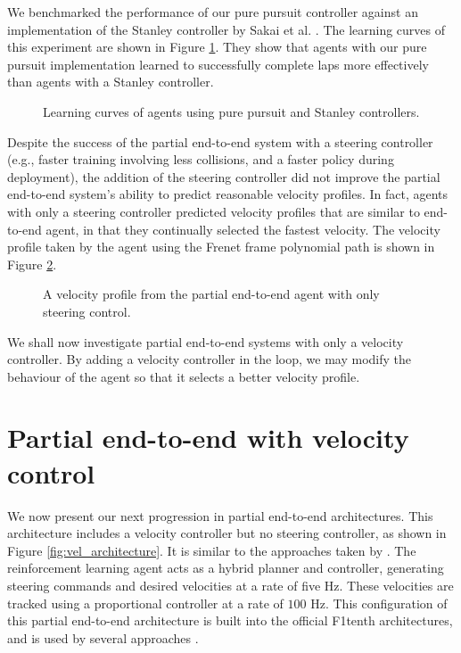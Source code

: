 We benchmarked the performance of our pure pursuit controller against an implementation of the Stanley controller by Sakai et al. \cite{Sakai2018}. 
The learning curves of this experiment are shown in Figure \ref{fig:path_tracker_comparison}.
They show that agents with our pure pursuit implementation learned to successfully complete laps more effectively than agents with a Stanley controller.

\begin{figure}[htb!]
    \centering
    
    \caption[Learning curves of agents using pure pursuit and Stanley controllers]{Learning curves of agents using pure pursuit and Stanley controllers.}
    \label{fig:path_tracker_comparison}
\end{figure}


Despite the success of the partial end-to-end system with a steering controller (e.g., faster training involving less collisions, and a faster policy during deployment), the addition of the steering controller did not improve the partial end-to-end system's ability to predict reasonable velocity profiles.
In fact, agents with only a steering controller predicted velocity profiles that are similar to end-to-end agent, in that they continually selected the fastest velocity. 
The velocity profile taken by the agent using the Frenet frame polynomial path is shown in Figure \ref{fig:velocity_profile_steer_agent}.
\begin{figure}[htb!]
    \centering
    
    \caption[Partial end-to-end velocity profile]{A velocity profile from the partial end-to-end agent with only steering control.}
    \label{fig:velocity_profile_steer_agent}
\end{figure}
We shall now investigate partial end-to-end systems with only a velocity controller. 
By adding a velocity controller in the loop, we may modify the behaviour of the agent so that it selects a better velocity profile.


\section{Partial end-to-end with velocity control}

We now present our next progression in partial end-to-end architectures. 
This architecture includes a velocity controller but no steering controller, as shown in Figure \ref{fig:vel_architecture}. 
It is similar to the approaches taken by \cite{Ghignone2022, Evans2021b, Evans2021a}.
The reinforcement learning agent acts as a hybrid planner and controller, generating steering commands and desired velocities at a rate of five Hz.
These velocities are tracked using a proportional controller at a rate of $100$ Hz.
This configuration of this partial end-to-end architecture is built into the official F1tenth architectures, and is used by several approaches \cite{hsu2022, Evans2021a}.

